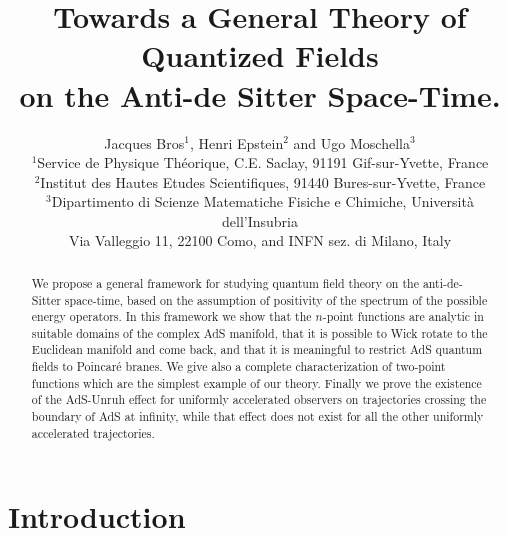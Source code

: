 \documentclass[a4paper,a4paper]{article}
\title{\bf Towards a General
Theory of Quantized Fields \\ on the Anti-de Sitter Space-Time.}
\author{{Jacques Bros$^{1}$, Henri Epstein$^{2}$ and Ugo Moschella$^{3}$  }\\[20pt]
 {\small $^{1}$Service de Physique Th\'eorique, C.E. Saclay,
{91191 Gif-sur-Yvette, France}}\\
{\small $^{2}$Institut des Hautes Etudes Scientifiques,
91440 Bures-sur-Yvette,
France}\\
{\small $^{3}$Dipartimento di Scienze Matematiche Fisiche e Chimiche, Universit\`a dell'Insubria}\\
{\small Via Valleggio 11, 22100 Como,
and INFN sez. di Milano, Italy}}
\date{\dateline}
\let\UnmodifSec=\section
\renewcommand{\section}{\setcounter{equation}{0}\UnmodifSec}
\begin{document}
\maketitle




\begin{abstract}
We propose a general framework for studying quantum field theory
on the anti-de-Sitter space-time, based on the assumption of
positivity of the spectrum of the possible energy operators. In
this framework we show that the $n$-point functions are analytic
in suitable domains of the complex AdS manifold, that it is
possible to Wick rotate to the Euclidean manifold and come back,
and that it is meaningful to restrict AdS quantum fields to
Poincar\'e branes. We give also a complete characterization of
two-point functions which are the simplest example of our theory.
Finally we prove the existence of the AdS-Unruh effect
for uniformly accelerated observers on trajectories
crossing the boundary of AdS at infinity, while
that effect does not exist for all the other
uniformly accelerated trajectories.


\end{abstract}


\section{Introduction}
\end{document}
